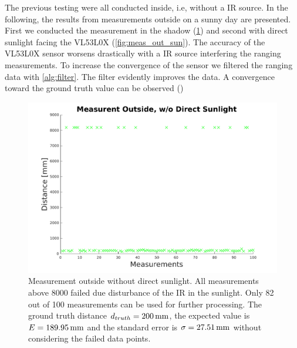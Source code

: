 The previous testing were all conducted inside, i.e, without a IR source. In the following, the results from measurements outside on a sunny day are presented. First we conducted the measurement in the shadow (\cref{fig:meas_out_shadow}) and second with direct sunlight facing the VL53L0X (\cref{fig:meas_out_sun}). The accuracy of the VL53L0X sensor worsens drastically with a IR source interfering the ranging measurements. To increase the convergence of the sensor we filtered the ranging data with \cref{alg:filter}. The filter evidently improves the data. A convergence toward the ground truth value can be observed ()
\begin{figure}
	\centering
	\includegraphics[width=0.9\linewidth]{pictures/plot_out_shadow.pdf}
	\caption{Measurement outside without direct sunlight. All measurements above 8000 failed due disturbance of the IR in the sunlight. Only 82 out of 100 measurements can be used for further processing. The ground truth distance $d_{truth}=\unit[200]{mm}$, the expected value is $E=\unit[189.95]{mm}$ and the standard error is $\sigma=\unit[27.51]{mm}$ without considering the failed data points.}
	\label{fig:meas_out_shadow}
\end{figure}

